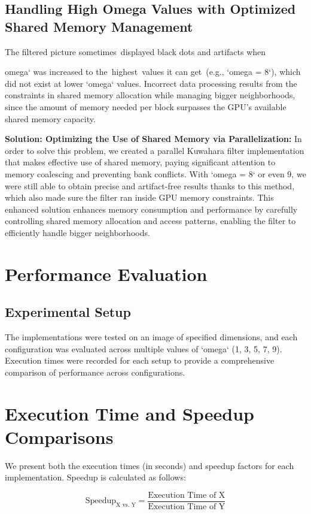 \documentclass{article}
\begin{document}
{\subsection{Handling High Omega Values with Optimized Shared Memory Management}
The filtered picture sometimes displayed black dots and artifacts when {omega` was increased to the highest values it can get (e.g., `omega = 8`), which did not exist at lower `omega` values. Incorrect data processing results from the constraints in shared memory allocation while managing bigger neighborhoods, since the amount of memory needed per block surpasses the GPU's available shared memory capacity.

\textbf{Solution: Optimizing the Use of Shared Memory via Parallelization:} In order to solve this problem, we created a parallel Kuwahara filter implementation that makes effective use of shared memory, paying significant attention to memory coalescing and preventing bank conflicts. With `omega = 8` or even 9, we were still able to obtain precise and artifact-free results thanks to this method, which also made sure the filter ran inside GPU memory constraints. This enhanced solution enhances memory consumption and performance by carefully controlling shared memory allocation and access patterns, enabling the filter to efficiently handle bigger neighborhoods.

\section{Performance Evaluation}

\subsection{Experimental Setup}
The implementations were tested on an image of specified dimensions, and each configuration was evaluated across multiple values of `omega` (1, 3, 5, 7, 9). Execution times were recorded for each setup to provide a comprehensive comparison of performance across configurations.

\section{Execution Time and Speedup Comparisons}

We present both the execution times (in seconds) and speedup factors for each implementation. Speedup is calculated as follows:

\[
\text{Speedup}_{\text{X vs. Y}} = \frac{\text{Execution Time of X}}{\text{Execution Time of Y}}
\]

}}
\end{document}
